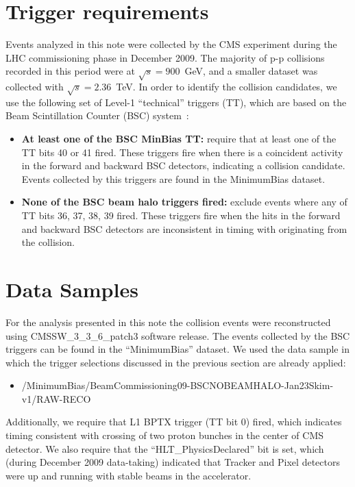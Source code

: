 \usepackage{multirow}
\usepackage{subfigure}  %

\section{Trigger requirements}
\label{sc:TriggerRequirements}

Events analyzed in this note were collected by the CMS experiment during the LHC
commissioning phase in December 2009. The majority of p-p collisions
recorded in this period were at $\sqrt{s}=900$~GeV, and a
smaller dataset was collected with $\sqrt{s}=2.36$~TeV. In order to
identify the collision candidates, we use the following
set of Level-1 ``technical'' triggers (TT), which are based on the Beam Scintillation
Counter (BSC) system~\cite{BSCTwiki}:

\begin{itemize}
\item{\bf At least one of the BSC MinBias TT:} require that at least one of
  the TT bits 40 or 41 fired. These triggers fire when there is a
  coincident activity in the forward and backward BSC detectors,
  indicating a collision candidate. Events collected by this triggers are found in the MinimumBias dataset.

\item{\bf None of the BSC beam halo triggers fired:} exclude events where any
  of TT bits 36, 37, 38, 39 fired. These triggers fire when the hits in
  the forward and backward BSC detectors are inconsistent in timing with
  originating from the collision.
\end{itemize}

\section{Data Samples}
\label{sc:DataSamples}

For the analysis presented in this note the
collision events were reconstructed using CMSSW\_3\_3\_6\_patch3 software release.
The events collected by the BSC triggers can be found in the ``MinimumBias'' dataset. 
We used the data sample in which the trigger selections
discussed in the previous section are already applied:
\begin{itemize}
\item /MinimumBias/BeamCommissioning09-BSCNOBEAMHALO-Jan23Skim-v1/RAW-RECO
\end{itemize}
Additionally, we require that L1 BPTX trigger (TT bit 0) fired, which
indicates timing consistent with crossing of two proton bunches in the center of CMS detector. 
We also require that the ``HLT\_PhysicsDeclared'' bit is set, which (during December 2009 
data-taking) indicated that Tracker and Pixel detectors were up and 
running with stable beams in the accelerator. 

